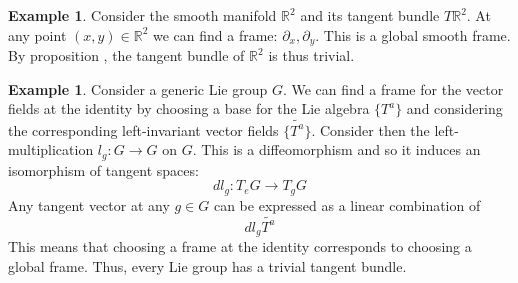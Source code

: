 \documentclass[12pt,a4paper]{report}
\theoremstyle{definition}
\theoremstyle{Theorem}
\theoremstyle{definition}
\newtheorem{Ex}[Def]{Example}
\theoremstyle{definition}
\begin{document}
	\begin{Ex}
		Consider the smooth manifold $\mathbb{R}^2$ and its tangent bundle $T\mathbb{R}^2$. At any point $(x,y)\in\mathbb{R}^2$ we can find a frame: $\partial_x,\partial_y$. This is a global smooth frame. By proposition $\label{prop_2.3.1}$, the tangent bundle of $\mathbb{R}^2$ is thus trivial.
	\end{Ex}
	\begin{Ex}
		Consider a generic Lie group $G$. We can find a frame for the vector fields at the identity by choosing a base for the Lie algebra $\{T^a\}$ and considering the corresponding left-invariant vector fields $\{\tilde{T^a}\}$. Consider then the left-multiplication $l_g:G\rightarrow G$ on $G$. This is a diffeomorphism and so it induces an isomorphism of tangent spaces:
		$$dl_g:T_eG\rightarrow T_gG$$
		Any tangent vector at any $g\in G$ can be expressed as a linear combination of
		$$dl_g\tilde{T^a}$$
		This means that choosing a frame at the identity corresponds to choosing a global frame. Thus, every Lie group has a trivial tangent bundle. 
	\end{Ex}
\end{document}
